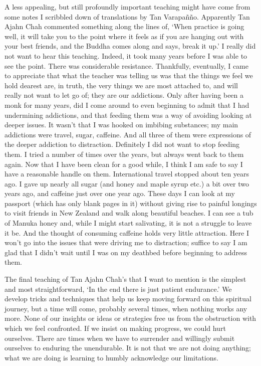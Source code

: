 A less appealing, but still profoundly important teaching might have
come from some notes I scribbled down of translations by Tan Varapañño.
Apparently Tan Ajahn Chah commented something along the lines of, `When
practice is going well, it will take you to the point where it feels as
if you are hanging out with your best friends, and the Buddha comes
along and says, break it up.' I really did not want to hear this
teaching. Indeed, it took many years before I was able to see the point.
There was considerable resistance. Thankfully, eventually, I came to
appreciate that what the teacher was telling us was that the things we
feel we hold dearest are, in truth, the very things we are most attached
to, and will really not want to let go of; they are our addictions. Only
after having been a monk for many years, did I come around to even
beginning to admit that I had undermining addictions, and that feeding
them was a way of avoiding looking at deeper issues. It wasn't that I
was hooked on imbibing substances; my main addictions were travel,
sugar, caffeine. And all three of them were expressions of the deeper
addiction to distraction. Definitely I did not want to stop feeding
them. I tried a number of times over the years, but always went back to
them again. Now that I have been clean for a good while, I think I am
safe to say I have a reasonable handle on them. International travel
stopped about ten years ago. I gave up nearly all sugar (and honey and
maple syrup etc.) a bit over two years ago, and caffeine just over one
year ago. These days I can look at my passport (which has only blank
pages in it) without giving rise to painful longings to visit friends in
New Zealand and walk along beautiful beaches. I can see a tub of Manuka
honey and, while I might start salivating, it is not a struggle to leave
it be. And the thought of consuming caffeine holds very little
attraction. Here I won't go into the issues that were driving me to
distraction; suffice to say I am glad that I didn't wait until I was on
my deathbed before beginning to address them.

The final teaching of Tan Ajahn Chah's that I want to mention is the
simplest and most straightforward, `In the end there is just patient
endurance.' We develop tricks and techniques that help us keep moving
forward on this spiritual journey, but a time will come, probably
several times, when nothing works any more. None of our insights or
ideas or strategies free us from the obstruction with which we feel
confronted. If we insist on making progress, we could hurt ourselves.
There are times when we have to surrender and willingly submit ourselves
to enduring the unendurable. It is not that we are not doing anything;
what we are doing is learning to humbly acknowledge our limitations.

